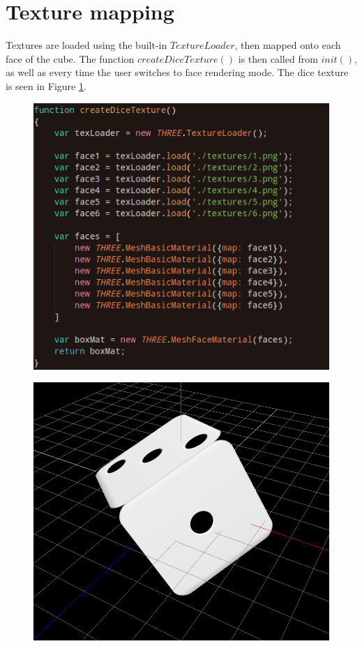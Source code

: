 \documentclass[12pt]{article}
\begin{document}
\section{Texture mapping}
Textures are loaded using the built-in $TextureLoader$, then mapped onto each face of the cube. The function $createDiceTexture()$ is then called from $init()$, as well as every time the user switches to face rendering mode. The dice texture is seen in Figure \ref{fig:14}.
\begin{figure}[H]
  \centering
  \begin{minipage}{.5\textwidth}
    \centering
    \includegraphics[width=.9\linewidth]{11.png}
    \label{fig:9}
  \end{minipage}%
  \begin{minipage}{.5\textwidth}
    \centering
    \includegraphics[width=.9\linewidth]{15.png}
    \label{fig:14}
  \end{minipage}
\end{figure}
\end{document}
